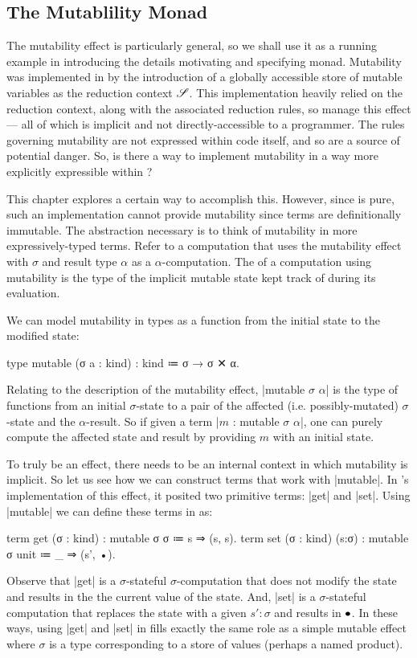 \subsection{The Mutablility Monad}
\label{sec:demo-monad}

The mutability effect is particularly general, so we shall use it as a running example in introducing the details motivating and specifying monad.
Mutability was implemented in \LangB by the introduction of a globally accessible store of mutable variables as the reduction context $\mathscr{S}$.
This implementation heavily relied on the reduction context, along with the associated reduction rules, so manage this effect --- all of which is implicit and not directly-accessible to a programmer.
The rules governing mutability are not expressed within \LangB code itself, and so are a source of potential danger.
So, is there a way to implement mutability in a way more explicitly expressible within \LangA?

This chapter explores a certain way to accomplish this.
However, since \LangA is pure, such an implementation cannot provide  mutability since \LangA terms are definitionally immutable.
The abstraction necessary is to think of mutability in more expressively-typed terms.
Refer to a computation that uses the mutability effect with  $σ$ and result type $α$ as a  $α$-computation.
The  of a computation using mutability is the type of the implicit mutable state kept track of during its evaluation.

We can model mutability in \LangA types as a function from the initial state to the modified state:
\begin{program}
type mutable (σ a : kind) : kind ≔ σ → σ ✕ α.
\end{program}
Relating to the description of the mutability effect, \code|mutable $σ$ $α$| is the type of functions from an initial $σ$-state to a pair of the affected (i.e. possibly-mutated) $σ$-state and the $α$-result.
So if given a term \code|$m$ : mutable $σ$ $α$|,
one can purely compute the affected state and result by providing $m$ with an initial state.

To truly be an effect, there needs to be an internal context in which mutability is implicit.
So let us see how we can construct terms that work with \code|mutable|.
In \LangB's implementation of this effect, it posited two primitive terms: \code|get| and \code|set|.
Using \code|mutable| we can define these terms in \LangA as:
\begin{snippet}
term get (σ : kind)       : mutable σ σ    ≔ s ⇒ (s, s).
term set (σ : kind) (s:σ) : mutable σ unit ≔ _ ⇒ (s', •).
\end{snippet}
Observe that
\code|get| is a $σ$-stateful $σ$-computation that does not modify the state and results in the the current value of the state.
And, \code|set| is a $σ$-stateful computation that replaces the state with a given $s':σ$ and results in $\bullet$.
In these ways, using \code|get| and \code|set| in \LangA fills exactly the same role as a simple \LangB mutable effect where $σ$ is a type corresponding to a store of values (perhaps a named product).


